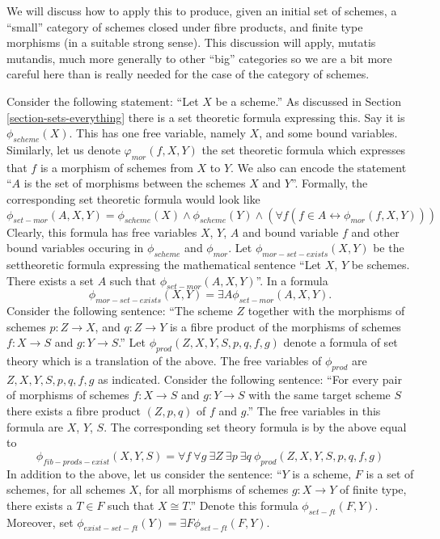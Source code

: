 \noindent
We will discuss how to apply this to produce, given an initial
set of schemes, a ``small'' category of schemes closed under
fibre products, and finite type morphisms (in a suitable strong sense).
This discussion will apply, mutatis mutandis, much more generally to
other ``big'' categories so we are a bit more careful here than is
really needed for the case of the category of schemes.

\medskip\noindent
Consider the following statement: ``Let $X$ be a scheme.''
As discussed in Section \ref{section-sets-everything}
there is a set theoretic formula expressing this.
Say it is $\phi_{scheme}(X)$.
This has one free variable, namely $X$, and some bound variables.
Similarly, let us denote
$\varphi_{mor}(f, X, Y)$ the set theoretic formula
which expresses that $f$ is a morphism of schemes
from $X$ to $Y$. We also can encode the statement
``$A$ is the set of morphisms between the schemes $X$ and $Y$''.
Formally, the corresponding set theoretic formula would look
like
$$
\phi_{set-mor}(A, X, Y) = 
\phi_{scheme}(X) \wedge \phi_{scheme}(Y) \wedge
(\forall f (f \in A \leftrightarrow \phi_{mor}(f, X, Y)))
$$
Clearly, this formula has free variables $X$, $Y$, $A$ and bound variable
$f$ and other bound variables occuring in $\phi_{scheme}$ and
$\phi_{mor}$. Let $\phi_{mor-set-exists}(X, Y)$
be the settheoretic formula expressing the mathematical sentence
``Let $X$, $Y$ be schemes. There exists a set $A$ such that
$\phi_{set-mor}(A, X, Y)$''. In a formula
$$
\phi_{mor-set-exists}(X, Y) = \exists A \phi_{set-mor}(A, X, Y).
$$
Consider the following sentence: ``The scheme $Z$ together
with the morphisms of schemes $p : Z \to X$, and $q : Z \to Y$ is a
fibre product of the morphisms of schemes $f : X \to S$ and
$g : Y \to S$.'' Let $\phi_{prod}(Z, X, Y, S, p, q, f, g)$ denote
a formula of set theory which is a translation of the above.
The free variables of $\phi_{prod}$ are $Z, X, Y, S, p, q, f, g$
as indicated.
Consider the following sentence: ``For every pair of morphisms of
schemes $f : X \to S$ and $g : Y \to S$ with the same target scheme $S$
there exists a fibre product $(Z, p, q)$ of $f$ and $g$.''
The free variables in this formula are $X$, $Y$, $S$.
The corresponding set theory formula is by the above
equal to
$$
\phi_{fib-prods-exist}(X, Y, S)
=
\forall f\ \forall g\ \exists Z\ \exists p\ \exists q\ 
\phi_{prod}(Z, X, Y, S, p, q, f, g)
$$
In addition to the above, let us consider the sentence:
``$Y$ is a scheme, $F$ is a set of schemes, for all schemes $X$,
for all morphisms of schemes $g : X \to Y$ of finite type, there exists a
$T \in F$ such that $X \cong T$.'' Denote this formula
$\phi_{set-ft}(F, Y)$. Moreover, set
$\phi_{exist-set-ft}(Y) = \exists F \phi_{set-ft}(F, Y)$.


